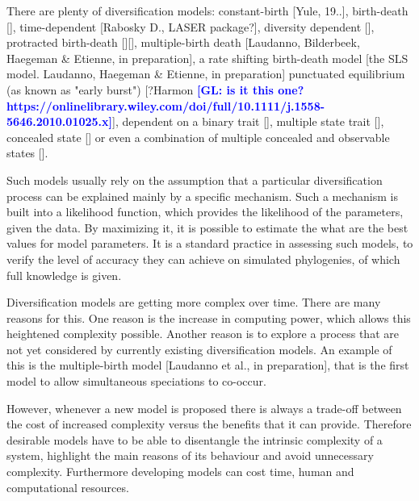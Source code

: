 \documentclass{article}
\newcommand{\giovanni}[1]{\textcolor{blue}{\textbf{[GL: #1]}}}
\begin{document}
There are plenty of diversification models: 
constant-birth [Yule, 19..],
birth-death [\cite{nee1994reconstructed}], 
time-dependent [Rabosky D., LASER package?], 
diversity dependent [\cite{etienne2011diversity}], 
protracted birth-death [\cite{rosindell2010protracted}][\cite{etienne2012prolonging}],
multiple-birth death [Laudanno, Bilderbeek, Haegeman \& Etienne, in preparation],
a rate shifting birth-death model [the SLS model. Laudanno, Haegeman \& Etienne, in preparation]
punctuated equilibrium (as known as "early burst") [?Harmon \giovanni{is it this one? https://onlinelibrary.wiley.com/doi/full/10.1111/j.1558-5646.2010.01025.x}],
dependent on a binary trait [\cite{maddison2007estimating}], 
multiple state trait [\cite{fitzjohn2012diversitree}],
concealed state [\cite{beaulieu2016detecting}] 
or even a combination of multiple concealed and observable states [\cite{herrera2018detecting}].

Such models usually rely on the assumption 
that a particular diversification process 
can be explained mainly by a specific mechanism.
Such a mechanism is built into a likelihood function, 
which provides the likelihood of the parameters, given the data.
By maximizing it, it is possible 
to estimate the what are the best values for model parameters. 
It is a standard practice in assessing such models,
to verify the level of accuracy they can achieve
on simulated phylogenies, of which full knowledge is given.

Diversification models are getting more complex over time. There are many
reasons for this. One reason is the increase in computing power,
which allows this heightened complexity possible.
Another reason is to explore a process that are not yet considered by currently existing diversification models. An example of this
is the multiple-birth model [Laudanno et al., in preparation], 
that is the first model to allow simultaneous speciations to co-occur.

However, whenever a new model is proposed there is always a trade-off between the cost of increased complexity versus the benefits that it can provide.
Therefore desirable models have to be able to disentangle the intrinsic complexity of a system, 
highlight the main reasons of its behaviour and avoid unnecessary complexity. Furthermore developing models can cost time, human and computational resources.

\end{document}
